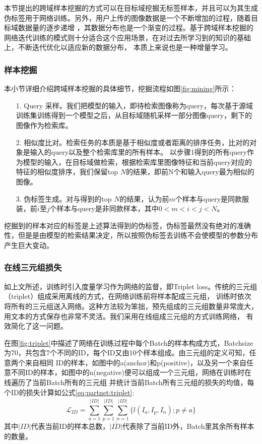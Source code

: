 本节提出的跨域样本挖掘的方式可以在目标域挖掘无标签样本，并且可以为其生成伪标签用于网络训练。另外，用户上传的图像数据是一个不断增加的过程，随着目标域数据量的逐步递增
，其数据分布也是一个渐变的过程。基于跨域样本挖掘的网络迭代训练的模式则十分适合这个应用场景，在对过去所学习到的知识的基础上，不断迭代优化以适应新的数据分布，
本质上来说也是一种增量学习。
\subsubsection{样本挖掘}

本小节详细介绍跨域样本挖掘的具体细节，挖掘流程如图\ref{fig:mining}所示：
\begin{itemize}
  \item[1.]Query 采样。我们把模型的输入，即待检索图像称为query，每次基于源域训练集训练得到一个模型之后，从目标域随机采样一部分图像query，剩下的图像作为检索库。
  \item[2.]相似度比对。检索任务的本质是基于相似度或者距离的排序任务，比对的对象是输入的query以及整个检索库里的所有样本。
  以步骤1得到的所有query作为模型的输入，在目标域做检索，根据检索库里图像特征和当前query对应的特征的相似度排序，我们保留top $N$的结果，即前N个和输入query最为相似的图像。
  \item[3.]伪标签生成。对与得到的top $N$的结果，认为前$m$个样本与query是同款服装，前$i$至$j$个样本与query是非同款样本，其中$0<m<i<j<N$。
\end{itemize}

挖掘到的样本对应的标签是上述算法得到的伪标签，伪标签最然没有绝对的准确性，但是是由模型的检索结果决定，所以按照伪标签去训练不会使模型的参数分布产生巨大变动。
\subsubsection{在线三元组损失}
如上文所述，训练时引入度量学习作为网络的监督，即Triplet loss。传统的三元组（triplet）组成采用离线的方式，在网络训练前将样本配成三元组，
训练时依次将所有的三元组送入网络。这种方法较为笨拙，预先组成的三元组数量非常庞大，用文本的方式保存也非常不灵活。我们采用在线组成三元组的方式训练网络，
有效简化了这一问题。


在图\ref{fig:triplet}中描述了网络在训练过程中每个Batch的样本构成方式，Batchsize为70，共包含7个不同的ID，每个ID又由10个样本组成。由三元组的定义可知，任意两个来自相同
ID的样本，如图中的a(anchor)和p(positive)，以及另一个来自任意不同ID的样本，如图中的n(negative)便可以组成一个三元组，网络在训练时在线遍历了当前Batch所有的三元组
并统计当前Batch所有三元组的损失的均值，每个ID的损失计算如公式\ref{eq:partnet:triplet}:
\begin{equation}
\label{eq:partnet:triplet}
\mathcal{L}_{ID}=\sum_{a=1}^{\left| ID \right|}\sum_{p=1}^{\left| ID \right|}\sum_{n=1}^{\bar{\left| ID \right|}} \{l(I_{a},I_{p},I_{n});p \ne a\}
\end{equation}
其中$\left| ID \right|$代表当前ID的样本总数，$\bar{\left| ID \right|}$代表除了当前ID外，Batch里其余所有样本的数量。

